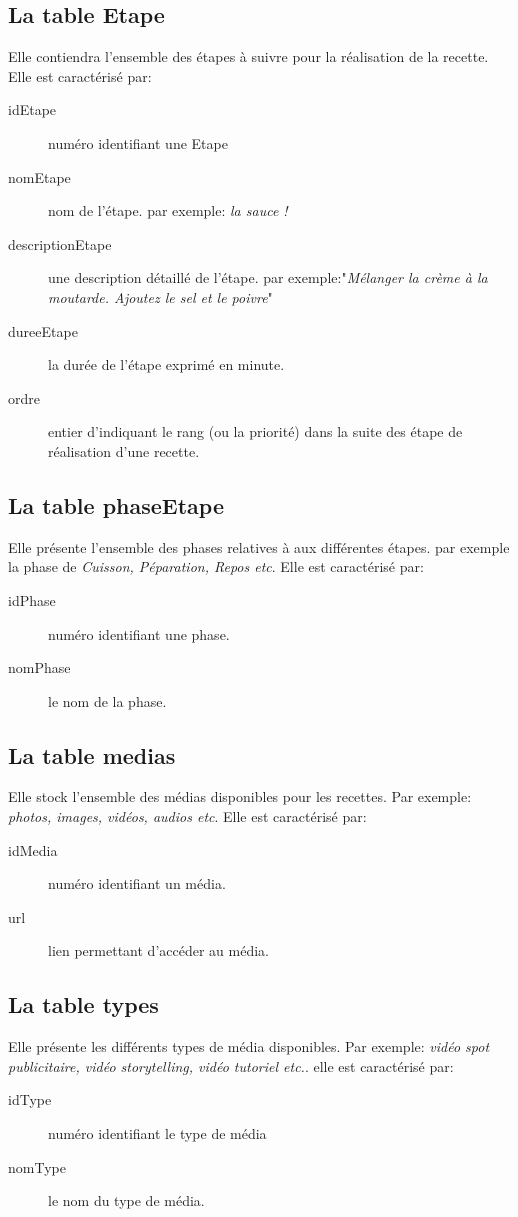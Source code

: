 \subsection{La table Etape}
Elle contiendra l'ensemble des étapes à suivre pour la réalisation de la recette. Elle est caractérisé par:
\begin{description}
    \item[idEtape] numéro identifiant une Etape
    \item[nomEtape] nom de l'étape. par exemple: \textit{la sauce !}
    \item[descriptionEtape] une description détaillé de l'étape. par exemple:"\textit{Mélanger la crème à la moutarde. Ajoutez le sel et le poivre}"
    \item[dureeEtape] la durée de l'étape exprimé en minute.
    \item[ordre] entier d'indiquant le rang (ou la priorité) dans la suite des étape de réalisation d'une recette.
\end{description}

\subsection{La table phaseEtape}
Elle présente l'ensemble des phases relatives à aux différentes étapes. par exemple la phase de \textit{Cuisson, Péparation, Repos etc}. Elle est caractérisé par:
\begin{description}
    \item[idPhase] numéro identifiant une phase.
    \item[nomPhase] le nom de la phase.
\end{description}

\subsection{La table medias}
Elle stock l'ensemble des médias disponibles pour les recettes. Par exemple: \textit{photos, images, vidéos, audios etc}. Elle est caractérisé par:
\begin{description}
    \item[idMedia] numéro identifiant un média.
    \item[url] lien permettant d'accéder au média.
\end{description}

\subsection{La table types}
Elle présente les différents types de média disponibles. Par exemple: \textit{vidéo spot publicitaire, vidéo storytelling, vidéo tutoriel etc.}. elle est caractérisé par:
\begin{description}
    \item[idType] numéro identifiant le type de média
    \item[nomType] le nom du type de média.
\end{description}


